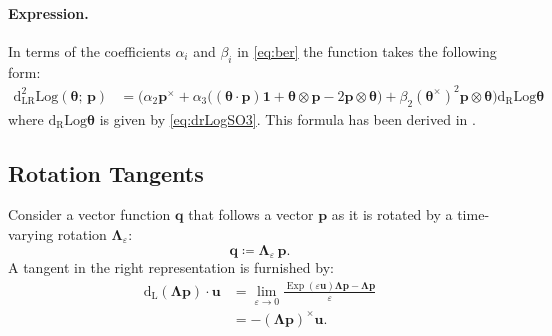 \paragraph*{Expression.}
%
In terms of the coefficients \(\alpha_i\) and \(\beta_i\) in
\eqref{eq:ber} the function takes the following form:
%
\begin{equation}
\begin{aligned}
\operatorname{d^2_{\scriptscriptstyle{LR}}Log}(\bm{\theta}; \, \bm{p}) 
&=\biggl(\alpha_2 {\bm{p}}^\times
       +\alpha_3\bigl(({\bm{\theta}}\cdot  \bm{p}) \mathbf{1}+{\bm{\theta}} \otimes \bm{p}-2 \bm{p}\otimes \bm{\theta} \bigr)
+\beta_2 \left({\bm{\theta}}^\times\right)^2  \bm{p}\otimes \bm{\theta}\biggr) \operatorname{d_{\scriptscriptstyle{R}}Log}{\bm{\theta}}
\end{aligned}
\label{eq:ddLogSO3}
\end{equation}
%
where \(\operatorname{d_{\scriptscriptstyle{R}}Log} {\bm{\theta}}\) is given by \eqref{eq:drLogSO3}.
This formula has been derived in \cite{nour-omid1991finite}.
%

\hypertarget{rotation-tangents}{%
\subsection{Rotation Tangents}\label{rotation-tangents}}

Consider a vector function \(\bm{q}\) that follows a vector \(\bm{p}\)
as it is rotated by a time-varying rotation
\(\bm{\Lambda}_{\varepsilon}\): %
\begin{equation*} 
\bm{q} \coloneq \bm{\Lambda}_{\varepsilon}\,\bm{p}.
\end{equation*}
%
A tangent in the right representation is furnished by:
\begin{equation}
\begin{aligned}
\operatorname{d_{L}}(\bm{\Lambda} \bm{p})\cdot\bm{u}&=\lim _{\varepsilon \rightarrow 0} \frac{\operatorname{Exp} \left(\varepsilon \bm{u}\right) \bm{\Lambda} \bm{p}-\bm{\Lambda} \bm{p}}{\varepsilon} \\
&=-(\bm{\Lambda} \bm{p})^{\times} \bm{u}.
\end{aligned}
\label{eq:LeftTangSO3}
\end{equation}



